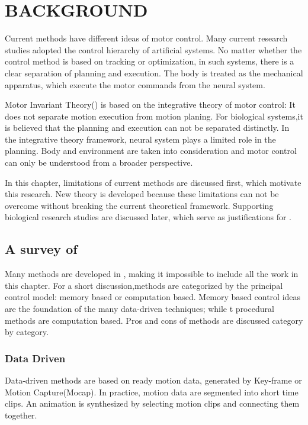 \chapter{BACKGROUND}
\label{chap:background}

Current \cms methods have different ideas of motor control.
Many current \cms research studies adopted the control hierarchy of artificial systems.
No matter whether the control method is based on tracking or optimization, in such systems, there is a clear separation of planning and execution.
The body is treated as the mechanical apparatus, which execute the motor commands from the neural system.



Motor Invariant Theory(\moit) is based on the integrative theory of motor control\citep{dickinson2000animals}:
It does not separate motion execution from motion planing.
For biological systems,it is believed that the planning and execution can not be separated distinctly.
In the integrative theory framework, neural system plays a limited role in the planning.
Body and environment are taken into consideration and motor control can only be understood from a broader perspective.

In this chapter, limitations of current \cms methods are discussed first, which motivate this research.
New theory is developed because these limitations can not be overcome without breaking the current theoretical framework.
Supporting biological research studies are discussed later,  which serve as justifications for \moit.



\section{A survey of \cms}

Many methods are developed in \cms, making it impossible to include all the work in this chapter.
For a short discussion,\cms methods are categorized by the principal control model: memory based or computation based.
Memory based control ideas are the foundation of the  many data-driven techniques;
while t procedural methods are computation based.
Pros and cons of methods are discussed category by category.

\subsection{Data Driven}
Data-driven methods are based on ready motion data,  generated by Key-frame or Motion Capture(Mocap). 
In practice, motion data are segmented into short time clips. 
An animation is synthesized by selecting motion clips and connecting them together\citep{Parent2002,kovar2003flexible}.

